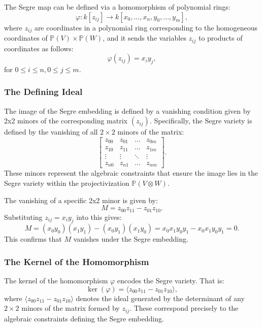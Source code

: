 The Segre map can be defined via a homomorphism of polynomial rings:
\[
\varphi: k[z_{ij}] \to k[x_0, \dots, x_n, y_0, \dots, y_m],
\]
where \( z_{ij} \) are coordinates in a polynomial ring corresponding to the homogeneous coordinates of \( \mathbb{P}(V) \times \mathbb{P}(W) \), and it sends the variables \( z_{ij} \) to products of coordinates as follows:
\[
\varphi(z_{ij}) = x_i y_j,
\]
for \( 0 \le i \le n, 0 \le j \le m \).

\subsubsection*{The Defining Ideal}

The image of the Segre embedding is defined by a vanishing condition given by 2x2 minors of the corresponding matrix \( (z_{ij}) \). Specifically, the Segre variety is defined by the vanishing of all \( 2 \times 2 \) minors of the matrix: \[
\begin{bmatrix}
z_{00} & z_{01} & \dots & z_{0m} \\
z_{10} & z_{11} & \dots & z_{1m} \\
\vdots & \vdots & \ddots & \vdots \\
z_{n0} & z_{n1} & \dots & z_{nm}
\end{bmatrix}.
\]
These minors represent the algebraic constraints that ensure the image lies in the Segre variety within the projectivization \( \mathbb{P}(V \otimes W) \).

The vanishing of a specific 2x2 minor is given by:
\[
M = z_{00} z_{11} - z_{01} z_{10}.
\]
Substituting \( z_{ij} = x_i y_j \) into this gives:
\[
M = (x_0 y_0)(x_1 y_1) - (x_0 y_1)(x_1 y_0) = x_0 x_1 y_0 y_1 - x_0 x_1 y_0 y_1 = 0.
\]
This confirms that \( M \) vanishes under the Segre embedding.

\subsubsection*{The Kernel of the Homomorphism}

The kernel of the homomorphism \( \varphi \) encodes the Segre variety. That is:
\[
\ker(\varphi) = \langle z_{00} z_{11} - z_{01} z_{10} \rangle,
\]
where \( \langle z_{00} z_{11} - z_{01} z_{10} \rangle \) denotes the ideal generated by the determinant of any \( 2 \times 2 \) minors of the matrix formed by \( z_{ij} \). These correspond precisely to the algebraic constraints defining the Segre embedding.

